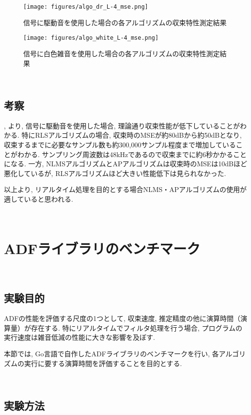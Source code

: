 \begin{figure}[H]
\centering
\texttt{[image: figures/algo\_dr\_L-4\_mse.png]}
\caption{信号に駆動音を使用した場合の各アルゴリズムの収束特性測定結果}
\label{fig:drone_algo_convergence}
\end{figure}

\begin{figure}[H]
\centering
\texttt{[image: figures/algo\_white\_L-4\_mse.png]}
\caption{信号に白色雑音を使用した場合の各アルゴリズムの収束特性測定結果}
\label{fig:white_algo_convergence}
\end{figure}

\
\subsection{考察}\label{consideration-benchmark}

, より, 信号に駆動音を使用した場合, 理論通り収束性能が低下していることがわかる. 特にRLSアルゴリズムの場合, 収束時のMSEが約80dBから約50dBとなり, 収束するまでに必要なサンプル数も約300,000サンプル程度まで増加していることがわかる. サンプリング周波数は48kHzであるので収束までに約6秒かかることになる. 一方, NLMSアルゴリズムとAPアルゴリズムは収束時のMSEは10dBほど悪化しているが, RLSアルゴリズムほど大きい性能低下は見られなかった. 

以上より, リアルタイム処理を目的とする場合NLMS・APアルゴリズムの使用が適していると思われる. 

\newpage

\
\section{ADFライブラリのベンチマーク}\label{benchmark}

\
\subsection{実験目的}\label{purpose-benchmark}

ADFの性能を評価する尺度の1つとして, 収束速度, 推定精度の他に演算時間（演算量）が存在する. 
特にリアルタイムでフィルタ処理を行う場合, プログラムの実行速度は雑音低減の性能に大きな影響を及ぼす. 

本節では, Go言語で自作したADFライブラリのベンチマークを行い, 各アルゴリズムの実行に要する演算時間を評価することを目的とする. 

\
\subsection{実験方法}\label{instruction-benchmark}

